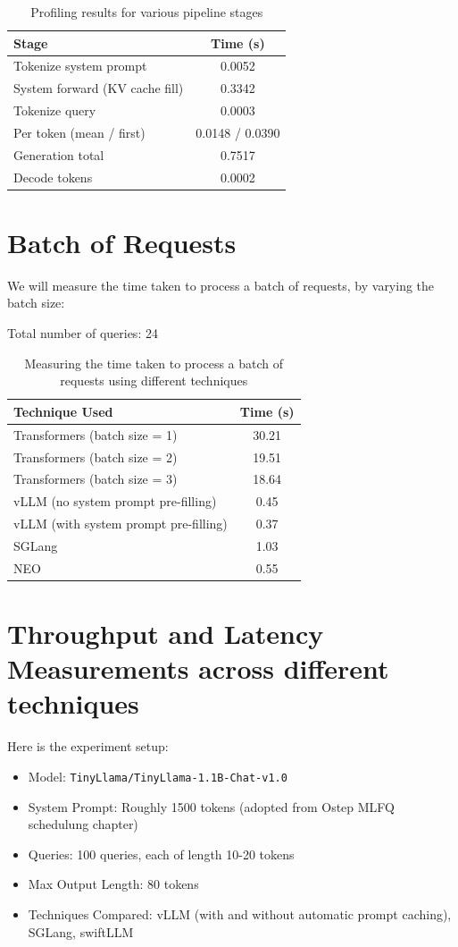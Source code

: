 \begin{table}[h]
\centering
\begin{tabular}{|l|c|}
\hline
\textbf{Stage} & \textbf{Time (s)} \\
\hline
Tokenize system prompt & 0.0052 \\
System forward (KV cache fill) & 0.3342 \\
Tokenize query & 0.0003 \\
Per token (mean / first) & 0.0148 / 0.0390 \\
Generation total & 0.7517 \\
Decode tokens & 0.0002 \\
\hline
\end{tabular}
\caption{Profiling results for various pipeline stages}
\end{table}


\section{Batch of Requests} 
We will measure the time taken to process a batch of requests, by varying the batch size:

Total number of queries:  24

\begin{table}[h]
\centering
\begin{tabular}{|l|c|}
\hline
\textbf{Technique Used} & \textbf{Time (s)} \\
\hline
Transformers (batch size = 1) & 30.21 \\
Transformers (batch size = 2) & 19.51 \\
Transformers (batch size = 3) & 18.64 \\
vLLM (no system prompt pre-filling) & 0.45 \\
vLLM (with system prompt pre-filling) & 0.37 \\
SGLang & 1.03 \\
NEO & 0.55 \\
\hline
\end{tabular}
\caption{Measuring the time taken to process a batch of requests using different techniques}
\end{table}

\section{Throughput and Latency Measurements across different techniques}
Here is the experiment setup:
\begin{itemize}
    \item Model: \texttt{TinyLlama/TinyLlama-1.1B-Chat-v1.0}
    \item System Prompt: Roughly 1500 tokens (adopted from Ostep MLFQ schedulung chapter)
    \item Queries: 100 queries, each of length 10-20 tokens
    \item Max Output Length: 80 tokens
    \item Techniques Compared: vLLM (with and without automatic prompt caching), SGLang, swiftLLM
\end{itemize}

